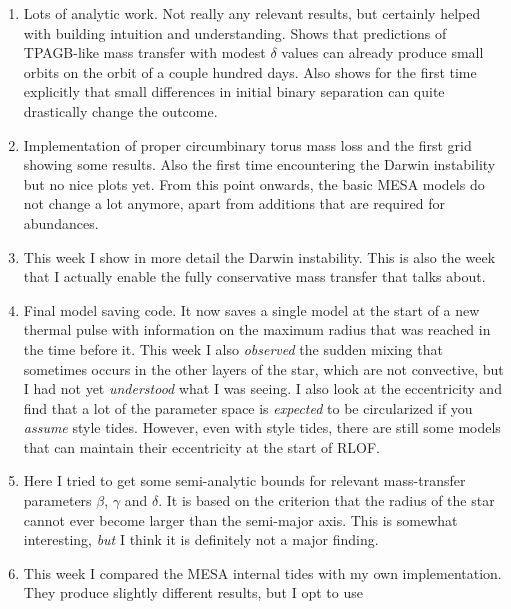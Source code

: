 \documentclass[a4paper,10pt]{article}
\begin{document}
\begin{enumerate}
	\item[\color{keywordscolor}12.] Lots of \citet{soberman1997} analytic work.
	      Not really any relevant results, but certainly helped with building intuition and understanding.
	      Shows that \citet{soberman1997} predictions of TPAGB-like mass transfer with modest \(\delta \) values
	      can already produce small orbits on the orbit of a couple hundred days.
	      Also shows for the first time explicitly that small differences in initial binary separation can quite drastically change the outcome.
	\item[\color{keywordscolor}13.] Implementation of proper circumbinary torus mass loss and the first grid showing some results.
	      Also the first time encountering the Darwin instability but no nice plots yet.
	      From this point onwards, the basic MESA models do not change a lot anymore, apart from additions that are required for abundances.
	\item[\color{keywordscolor}14.] This week I show in more detail the Darwin instability.
	      This is also the week that I actually enable the fully conservative mass transfer that \citet{temmink2025} talks about.
	\item[\color{keywordscolor}15 -- 16.] Final model saving code.
	      It now saves a single model at the start of a new thermal pulse with information on the maximum radius that was reached in the time before it.
	      This week I also \emph{observed} the sudden mixing that sometimes occurs in the other layers of the star, which are not convective, but I had not yet \emph{understood} what I was seeing.
	      I also look at the
	      eccentricity and find that a lot of the parameter space is \emph{expected} to be circularized if you \emph{assume} \citet{hut1981} style tides.
	      However, even with \citet{hut1981} style tides, there are still some models that can maintain their eccentricity at the start of RLOF.
	\item[\color{keywordscolor}17.] Here I tried to get some semi-analytic bounds for relevant mass-transfer
	      parameters \(\beta \), \(\gamma \) and \(\delta \).
	      It is based on the criterion that the
	      radius of the star cannot ever become larger than the semi-major axis.
	      This is somewhat interesting, \emph{but} I think it is definitely not a major finding.
	\item[\color{keywordscolor}18.] This week I compared the MESA internal tides with my
	      own implementation.
	      They produce slightly different results, but I opt to use

\end{enumerate}
\end{document}

